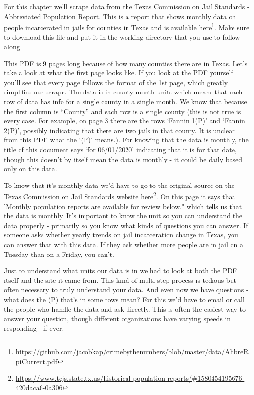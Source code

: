 \documentclass[
]{krantz}
\renewcommand{\href}[2]{#2\footnote{\url{#1}}}
\begin{document}
For this chapter we'll scrape data from the Texas Commission on Jail Standards - Abbreviated Population Report. This is a report that shows monthly data on people incarcerated in jails for counties in Texas and is available \href{https://github.com/jacobkap/crimebythenumbers/blob/master/data/AbbreRptCurrent.pdf}{here}. Make sure to download this file and put it in the working directory that you use to follow along.

This PDF is 9 pages long because of how many counties there are in Texas. Let's take a look at what the first page looks like. If you look at the PDF yourself you'll see that every page follows the format of the 1st page, which greatly simplifies our scrape. The data is in county-month units which means that each row of data has info for a single county in a single month. We know that because the first column is ``County'' and each row is a single county (this is not true is every case. For example, on page 3 there are the rows `Fannin 1(P)' and `Fannin 2(P)', possibly indicating that there are two jails in that county. It is unclear from this PDF what the `(P)' means.). For knowing that the data is monthly, the title of this document says `for 06/01/2020' indicating that it is for that date, though this doesn't by itself mean the data is monthly - it could be daily based only on this data.

To know that it's monthly data we'd have to go to the original source on the Texas Commission on Jail Standards website \href{https://www.tcjs.state.tx.us/historical-population-reports/\#1580454195676-420daca6-0a306}{here}. On this page it says that 'Monthly population reports are available for review below," which tells us that the data is monthly. It's important to know the unit so you can understand the data properly - primarily so you know what kinds of questions you can answer. If someone asks whether yearly trends on jail incarceration change in Texas, you can answer that with this data. If they ask whether more people are in jail on a Tuesday than on a Friday, you can't.

Just to understand what units our data is in we had to look at both the PDF itself and the site it came from. This kind of multi-step process is tedious but often necessary to truly understand your data. And even now we have questions - what does the (P) that's in some rows mean? For this we'd have to email or call the people who handle the data and ask directly. This is often the easiest way to answer your question, though different organizations have varying speeds in responding - if ever.
\end{document}
